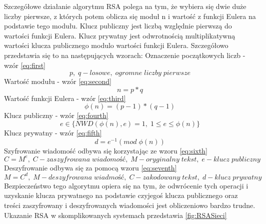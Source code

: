 Szczegółowe działanie algorytmu RSA polega na tym, że wybiera się dwie duże liczby pierwsze, z których potem oblicza się moduł n i wartość z funkcji Eulera na podstawie tego modułu. Klucz publiczny jest liczbą względnie pierwszą do wartości funkcji Eulera. Klucz prywatny jest odwrotnością multiplikatywną wartości klucza publicznego modulo wartości funkcji Eulera. Szczegółowo przedstawia się to na następujących wzorach:
\newline Oznaczenie początkowych liczb - wzór \ref{eq:first}
\begin{equation}
    p, \; q-losowe, \; ogromne \; liczby \; pierwsze
    \label{eq:first}
\end{equation}
Wartość modułu - wzór \ref{eq:second}
\begin{equation}
    n=p*q
    \label{eq:second}
\end{equation}
Wartość funkcji Eulera - wzór \ref{eq:third}
\begin{equation}
    \phi(n)=(p-1)*(q-1)
    \label{eq:third}
\end{equation}
Klucz publiczny - wzór \ref{eq:fourth}
\begin{equation}
    e \in \{NWD(\phi(n),e)=1, \; 1 \leqslant e \leqslant \phi(n)\}
    \label{eq:fourth}
\end{equation}
Klucz prywatny - wzór \ref{eq:fifth}
\begin{equation}
    d= e^{-1} (mod \; \phi(n))
    \label{eq:fifth}
\end{equation}
Szyfrowanie wiadomość odbywa się korzystając ze wzoru \ref{eq:sixth}
\begin{equation}
    C= M^e, \; C-zaszyfrowana \;  wiadomość, \; M-oryginalny \; tekst, \; e-klucz \; publiczny
    \label{eq:sixth}
\end{equation}
Deszyfrowanie odbywa się za pomocą wzoru \ref{eq:seventh}
\begin{equation}
    M= C^d, \; M-deszyfrowana \; wiadmość, \;C-zakodowany \; tekst, \; d-klucz \; prywatny
    \label{eq:seventh}
\end{equation}
Bezpieczeństwo tego algorytmu opiera się na tym, że odwrócenie tych operacji i uzyskanie klucza prywatnego na podstawie czyjegoś klucza publicznego oraz treści zaszyfrowany i deszyfrowanych wiadomości jest obliczeniowo bardzo trudne. Ukazanie RSA w skomplikowanych systemach przedstawia \figurename{ \ref{fig:RSASieci}}
